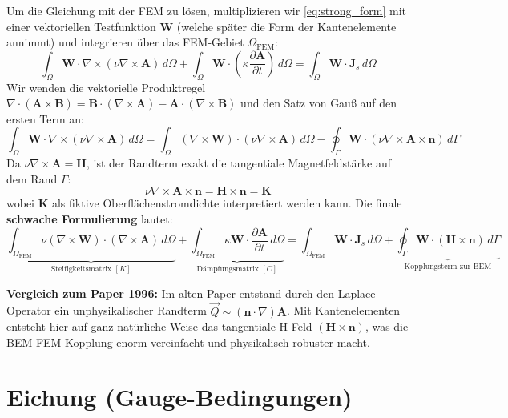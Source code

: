 \documentclass[11pt,a4paper]{article}
\newcommand{\vA}{\bm{A}}
\newcommand{\vB}{\bm{B}}
\newcommand{\vH}{\bm{H}}
\newcommand{\vJ}{\bm{J}}
\newcommand{\vn}{\bm{n}}
\newcommand{\vW}{\bm{W}} %
\newcommand{\vK}{\bm{K}} %
\newcommand{\rot}{\nabla \times}
\newcommand{\grad}{\nabla}
\renewcommand{\div}{\nabla \cdot}
\begin{document}
Um die Gleichung mit der FEM zu lösen, multiplizieren wir \eqref{eq:strong_form} mit einer vektoriellen Testfunktion $\vW$ (welche später die Form der Kantenelemente annimmt) und integrieren über das FEM-Gebiet $\Omega_{\text{FEM}}$:
\begin{equation}
    \int_{\Omega} \vW \cdot \rot (\nu \rot \vA) \, d\Omega + \int_{\Omega} \vW \cdot \left( \kappa \frac{\partial \vA}{\partial t} \right) \, d\Omega = \int_{\Omega} \vW \cdot \vJ_s \, d\Omega
\end{equation}
Wir wenden die vektorielle Produktregel $\div (\vA \times \vB) = \vB \cdot (\rot \vA) - \vA \cdot (\rot \vB)$ und den Satz von Gauß auf den ersten Term an:
\begin{equation}
    \int_{\Omega} \vW \cdot \rot (\nu \rot \vA) \, d\Omega = \int_{\Omega} (\rot \vW) \cdot (\nu \rot \vA) \, d\Omega - \oint_{\Gamma} \vW \cdot (\nu \rot \vA \times \vn) \, d\Gamma
\end{equation}
Da $\nu \rot \vA = \vH$, ist der Randterm exakt die tangentiale Magnetfeldstärke auf dem Rand $\Gamma$:
\begin{equation}
    \nu \rot \vA \times \vn = \vH \times \vn = \vK
\end{equation}
wobei $\vK$ als fiktive Oberflächenstromdichte interpretiert werden kann. Die finale \textbf{schwache Formulierung} lautet:
\begin{equation}
    \underbrace{\int_{\Omega_{\text{FEM}}} \nu (\rot \vW) \cdot (\rot \vA) \, d\Omega}_{\text{Steifigkeitsmatrix } [K]} 
    + \underbrace{\int_{\Omega_{\text{FEM}}} \kappa \vW \cdot \frac{\partial \vA}{\partial t} \, d\Omega}_{\text{Dämpfungsmatrix } [C]} 
    = \int_{\Omega_{\text{FEM}}} \vW \cdot \vJ_s \, d\Omega 
    + \underbrace{\oint_{\Gamma} \vW \cdot (\vH \times \vn) \, d\Gamma}_{\text{Kopplungsterm zur BEM}} \label{eq:weak_form}
\end{equation}

\textbf{Vergleich zum Paper 1996:} Im alten Paper entstand durch den Laplace-Operator ein unphysikalischer Randterm $\vec{Q} \sim (\vn \cdot \grad)\vA$. Mit Kantenelementen entsteht hier auf ganz natürliche Weise das tangentiale H-Feld $(\vH \times \vn)$, was die BEM-FEM-Kopplung enorm vereinfacht und physikalisch robuster macht.

\section{Eichung (Gauge-Bedingungen)}
\end{document}
